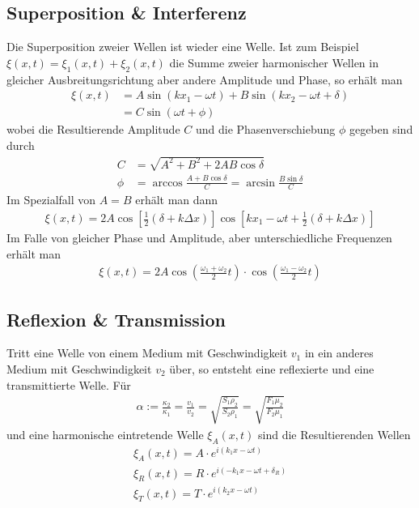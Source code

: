 \subsection{Superposition \& Interferenz}
Die Superposition zweier Wellen ist wieder eine Welle.
Ist zum Beispiel $\xi(x,t) = \xi_1(x,t) + \xi_2(x,t)$ die Summe zweier harmonischer Wellen in gleicher Ausbreitungsrichtung aber andere Amplitude und Phase, so erhält man
\begin{align*}
    \xi(x,t) &= A \sin(k x_1 - \omega t) + B \sin(k x_2 -\omega t + \delta)\\
    &= C \sin(\omega t +\phi)
\end{align*}
wobei die Resultierende Amplitude $C$ und die Phasenverschiebung $\phi$ gegeben sind durch
\begin{align*}
    C &= \sqrt{A^2 + B^2 + 2AB \cos\delta}\\
    \phi &= \arccos \frac{A + B \cos \delta}{C} = \arcsin \frac{B \sin \delta}{C}
\end{align*}
Im Spezialfall von $A = B$ erhält man dann
\begin{align*}
    \xi(x,t) = 2A \cos \left[\frac{1}{2}(\delta + k \Delta x)\right] \cos \left[k x_1 - \omega t + \frac{1}{2}(\delta + k \Delta x)\right]
\end{align*}
Im Falle von gleicher Phase und Amplitude, aber unterschiedliche Frequenzen erhält man
\begin{align*}
    \xi(x,t) = 2A \cos \left(\frac{\omega_1 + \omega_2}{2}t\right) \cdot \cos \left(\frac{\omega_1 - \omega_2}{2}t\right)
\end{align*}

\subsection{Reflexion \& Transmission}
Tritt eine Welle von einem Medium mit Geschwindigkeit $v_1$ in ein anderes Medium mit Geschwindigkeit $v_2$ über, so entsteht eine reflexierte und eine transmittierte Welle. Für
\begin{align*}
    \alpha := \frac{\kappa_2}{\kappa_1} = \frac{v_1}{v_2}  = \sqrt{\frac{S_1 \rho_2}{S_2\rho_1}} = \sqrt{\frac{F_1 \mu_2}{F_2 \mu_1}}
\end{align*}
und eine harmonische eintretende Welle $\xi_A(x,t)$ sind die Resultierenden Wellen      
\begin{align*}
    \xi_A(x,t) = A \cdot e^{i(k_1x - \omega t)}\\\xi_R(x,t) = R \cdot e^{i(-k_1x-\omega t + \delta_R)}\\\xi_T(x,t) = T \cdot e^{i(k_2 x - \omega t)}
\end{align*}


